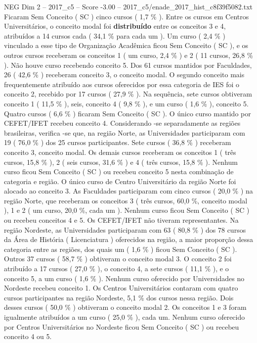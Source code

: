\begin{textsample}{NEG Dim 2 – 2017\_c5 – Score -3.00 – 2017\_c5/enade\_2017\_hist\_c8f39f5082.txt}
Ficaram Sem Conceito ( SC ) cinco cursos ( 1,7 \% ).
Entre os cursos em Centros Universitários, o conceito modal foi \textbf{distribuído} entre os conceitos 3 e 4, atribuídos a 14 cursos cada ( 34,1 \% para cada um ).
Um curso ( 2,4 \% ) vinculado a esse tipo de Organização Acadêmica ficou Sem Conceito ( SC ), e os outros cursos receberam os conceitos 1 ( um curso, 2,4 \% ) e 2 ( 11 cursos, 26,8 \% ).
Não houve curso recebendo conceito 5.
Dos 61 cursos mantidos por Faculdades, 26 ( 42,6 \% ) receberam conceito 3, o conceito modal.
O segundo conceito mais frequentemente atribuído aos cursos oferecidos por essa categoria de IES foi o conceito 2, recebido por 17 cursos ( 27,9 \% ).
Na sequência, sete cursos obtiveram conceito 1 ( 11,5 \% ), seis, conceito 4 ( 9,8 \% ), e um curso ( 1,6 \% ), conceito 5.
Quatro cursos ( 6,6 \% ) ficaram Sem Conceito ( SC ).
O único curso mantido por CEFET/IFET recebeu conceito 4.
Considerando -se separadamente as regiões brasileiras, verifica -se que, na região Norte, as Universidades participaram com 19 ( 76,0 \% ) dos 25 cursos participantes.
Sete cursos ( 36,8 \% ) receberam conceito 3, conceito modal.
Os demais cursos receberam os conceitos 1 ( três cursos, 15,8 \% ), 2 ( seis cursos, 31,6 \% ) e 4 ( três cursos, 15,8 \% ).
Nenhum curso ficou Sem Conceito ( SC ) ou recebeu conceito 5 nesta combinação de categoria e região.
O único curso de Centro Universitário da região Norte foi alocado ao conceito 3.
As Faculdades participaram com cinco cursos ( 20,0 \% ) na região Norte, que receberam os conceitos 3 ( três cursos, 60,0 \%, conceito modal ), 1 e 2 ( um curso, 20,0 \%, cada um ).
Nenhum curso ficou Sem Conceito ( SC ) ou recebeu conceitos 4 e 5.
Os CEFET/IFET não tiveram representantes.
Na região Nordeste, as Universidades participaram com 63 ( 80,8 \% ) dos 78 cursos da Área de História ( Licenciatura ) oferecidos na região, a maior proporção dessa categoria entre as regiões, dos quais um ( 1,6 \% ) ficou Sem Conceito ( SC ).
Outros 37 cursos ( 58,7 \% ) obtiveram o conceito modal 3.
O conceito 2 foi atribuído a 17 cursos ( 27,0 \% ), o conceito 4, a sete cursos ( 11,1 \% ), e o conceito 5, a um curso ( 1,6 \% ).
Nenhum curso oferecido por Universidades no Nordeste recebeu conceito 1.
Os Centros Universitários contaram com quatro cursos participantes na região Nordeste, 5,1 \% dos cursos nessa região.
Dois desses cursos ( 50,0 \% ) obtiveram o conceito modal 2.
Os conceitos 1 e 3 foram igualmente atribuídos a um curso ( 25,0 \% ), cada um.
Nenhum curso oferecido por Centros Universitários no Nordeste ficou Sem Conceito ( SC ) ou recebeu conceito 4 ou 5.

\end{textsample}
